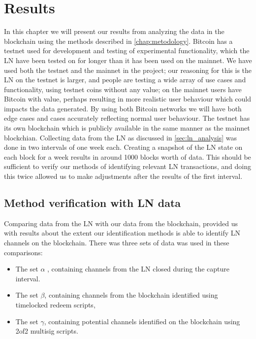 \chapter{Results}
\label{chap:results}

In this chapter we will present our results from analyzing the data in the blockchain using the methods described in \cref{chap:metodology}. 
Bitcoin has a testnet used for development and testing of experimental functionality, which the LN have been tested on for longer than it has been used on the mainnet. We have used both the testnet and the mainnet in the project; our reasoning for this is the LN on the testnet is larger, and people are testing a wide array of use cases and functionality, using testnet coins without any value; on the mainnet users have Bitcoin with value, perhaps resulting in more realistic user behaviour which could impacts the data generated.
By using both Bitcoin networks we will have both edge cases and cases accurately reflecting normal user behaviour.
The testnet has its own blockchain which is publicly available in the same manner as the mainnet blockchian. Collecting data from the LN as discussed in \cref{sec:ln_analysis} was done in two intervals of one week each.
Creating a snapshot of the LN state on each block for a week results in around 1000 blocks worth of data. This should be sufficient to verify our methods of identifying relevant LN transactions, and doing this twice allowed us to make adjustments after the results of the first interval. 

\section{Method verification with LN data}

Comparing data from the LN with our data from the blockchain, provided us with results about the extent our identification methods is able to identify LN channels on the blockchain. There was three sets of data was used in these comparisons: 
\begin{itemize}
    \item The set \( \alpha \) , containing channels from the LN closed during the capture interval. 
    \item The set \( \beta \), containing channels from the blockchain identified using timelocked redeem scripts,
    \item The set  \( \gamma \), containing potential channels identified on the blockchain using 2of2 multisig scripts.
\end{itemize}

